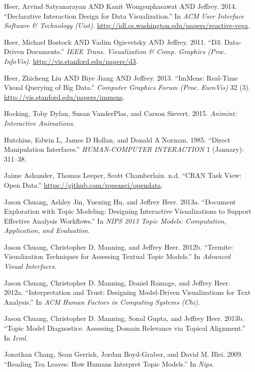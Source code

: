 \documentclass[12pt,]{isuthesis}
\begin{document}
\hypertarget{ref-vega}{}
Heer, Arvind Satyanarayan AND Kanit Wongsuphasawat AND Jeffrey. 2014.
``Declarative Interaction Design for Data Visualization.'' In \emph{ACM
User Interface Software \& Technology (Uist)}.
\url{http://idl.cs.washington.edu/papers/reactive-vega}.

\hypertarget{ref-Bostock:2011}{}
Heer, Michael Bostock AND Vadim Ogievetsky AND Jeffrey. 2011. ``D3:
Data-Driven Documents.'' \emph{IEEE Trans. Visualization \& Comp.
Graphics (Proc. InfoVis)}. \url{http://vis.stanford.edu/papers/d3}.

\hypertarget{ref-2013-immens}{}
Heer, Zhicheng Liu AND Biye Jiang AND Jeffrey. 2013. ``ImMens: Real-Time
Visual Querying of Big Data.'' \emph{Computer Graphics Forum (Proc.
EuroVis)} 32 (3). \url{http://vis.stanford.edu/papers/immens}.

\hypertarget{ref-animint}{}
Hocking, Toby Dylan, Susan VanderPlas, and Carson Sievert. 2015.
\emph{Animint: Interactive Animations}.

\hypertarget{ref-Hutchins:1985wu}{}
Hutchins, Edwin L, James D Hollan, and Donald A Norman. 1985. ``Direct
Manipulation Interfaces.'' \emph{HUMAN-COMPUTER INTERACTION} 1
(January): 311--38.

\hypertarget{ref-OpenData}{}
Jaime Ashander, Thomas Leeper, Scott Chamberlain. n.d. ``CRAN Task View:
Open Data.'' \url{https://github.com/ropensci/opendata}.

\hypertarget{ref-2013-termite}{}
Jason Chuang, Ashley Jin, Yuening Hu, and Jeffrey Heer. 2013a.
``Document Exploration with Topic Modeling: Designing Interactive
Visualizations to Support Effective Analysis Workflows.'' In \emph{NIPS
2013 Topic Models: Computation, Application, and Evaluation}.

\hypertarget{ref-2012-termite}{}
Jason Chuang, Christopher D. Manning, and Jeffrey Heer. 2012b.
``Termite: Visualization Techniques for Assessing Textual Topic
Models.'' In \emph{Advanced Visual Interfaces}.

\hypertarget{ref-2012-trust}{}
Jason Chuang, Christopher D. Manning, Daniel Ramage, and Jeffrey Heer.
2012a. ``Interpretation and Trust: Designing Model-Driven Visualizations
for Text Analysis.'' In \emph{ACM Human Factors in Computing Systems
(Chi)}.

\hypertarget{ref-2013-diagnostics}{}
Jason Chuang, Christopher D. Manning, Sonal Gupta, and Jeffrey Heer.
2013b. ``Topic Model Diagnostics: Assessing Domain Relevance via Topical
Alignment.'' In \emph{Icml}.

\hypertarget{ref-Chang}{}
Jonathan Chang, Sean Gerrish, Jordan Boyd-Graber, and David M. Blei.
2009. ``Reading Tea Leaves: How Humans Interpret Topic Models.'' In
\emph{Nips}.
\end{document}
